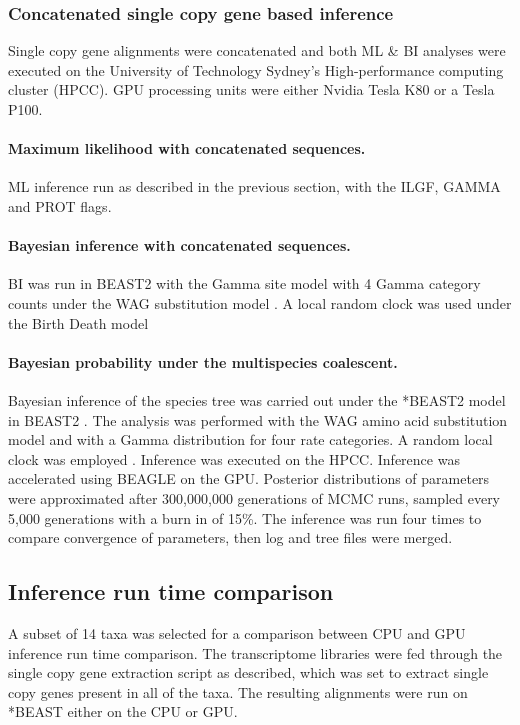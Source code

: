 \documentclass[12pt]{article}
\begin{document}
\subsubsection*{Concatenated single copy gene based inference}
Single copy gene alignments were concatenated and both ML \& BI analyses were executed on the University of Technology Sydney's High-performance computing cluster (HPCC). 
GPU processing units were either Nvidia Tesla K80 or a Tesla P100. 
\paragraph*{Maximum likelihood with concatenated sequences.}
ML inference run as described in the previous section, with the ILGF, GAMMA and PROT flags.
\paragraph*{Bayesian inference with concatenated sequences.}
BI was run in BEAST2 with the Gamma site model with 4 Gamma category counts under the WAG substitution model \cite{whelan2001general}. A local random clock was used  under the Birth Death model %
 

\paragraph*{Bayesian probability under the multispecies coalescent.}
Bayesian inference of the species tree was carried out under the *BEAST2 model in BEAST2 \cite{bouckaert2014beast}. 
The analysis was performed with the WAG amino acid substitution model \cite{whelan2001general} and with a Gamma distribution for four rate categories. 
A random local clock was employed \cite{drummond2010bayesian}. 
Inference was executed on the HPCC. 
Inference was accelerated using BEAGLE \cite{ayres2011beagle} on the GPU. 
Posterior distributions of parameters were approximated after 300,000,000 generations of MCMC runs, sampled every 5,000 generations with a burn in of 15\%. 
The inference was run four times to compare convergence of parameters, then log and tree files were merged. 


\subsection*{Inference run time comparison}
A subset of 14 taxa was selected for a comparison between CPU and GPU inference run time comparison. 
The transcriptome libraries were fed through the single copy gene extraction script as described, which was set to extract single copy genes present in all of the taxa. 
The resulting alignments were run on *BEAST either on the CPU or GPU.
\end{document}
